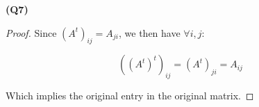 \documentclass[12pt, a4paper]{article}
\begin{document}
\textbf{(Q7)}

\begin{proof}
    Since $(A^t)_{ij} = A_{ji}$, we then have $\forall i, j$:
    
    \[
        ((A^t)^t)_{ij} = (A^t)_{ji} = A_{ij}
    \]

    Which implies the original entry in the original matrix.
\end{proof}
\end{document}
